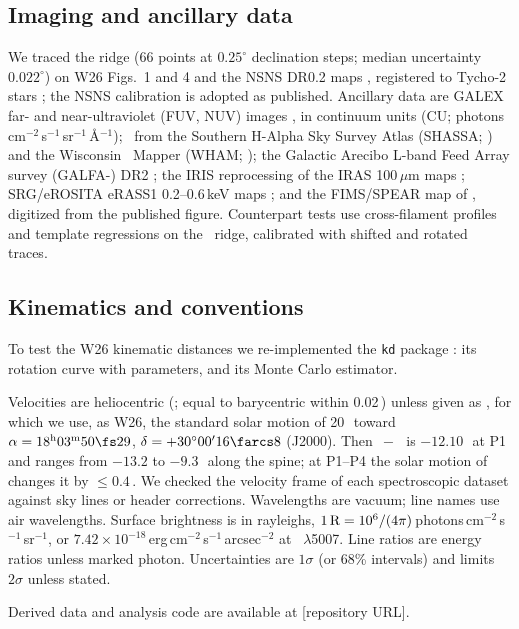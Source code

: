 \subsection{Imaging and ancillary data}

We traced the ridge (66 points at $0.25^\circ$ declination steps; median uncertainty $0.022^\circ$) on W26 Figs.~1 and 4 and the NSNS DR0.2 maps \citep{Ziegenbalg2025}, registered to Tycho-2 stars \citep{Hog2000}; the NSNS calibration is adopted as published. Ancillary data are GALEX far- and near-ultraviolet (FUV, NUV) images \citep{Martin2005,Morrissey2007}, in continuum units (CU; photons\,cm$^{-2}$\,s$^{-1}$\,sr$^{-1}$\,\AA$^{-1}$); \Ha\ from the Southern H-Alpha Sky Survey Atlas (SHASSA; \citealt{Gaustad2001}) and the Wisconsin \Ha\ Mapper (WHAM; \citealt{Haffner2003}); the Galactic Arecibo L-band Feed Array  survey (GALFA-) DR2 \citep{Peek2018}; the IRIS reprocessing of the IRAS 100\,$\mu$m maps \citep{MivilleDeschenes2005}; SRG/eROSITA eRASS1 0.2--0.6\,keV maps \citep{Merloni2024}; and the FIMS/SPEAR  map of \citet{Kim2007}, digitized from the published figure. Counterpart tests use cross-filament profiles and template regressions on the \Oiii\ ridge, calibrated with shifted and rotated traces.

\subsection{Kinematics and conventions}

To test the W26 kinematic distances we re-implemented the \texttt{kd} package \citep{Wenger2018}: its \citet{Persic1996} rotation curve with \citet{Reid2014} parameters, and its Monte Carlo estimator.

Velocities are heliocentric (\vhel; equal to barycentric within 0.02\,\kms) unless given as \vlsr, for which we use, as W26, the standard solar motion of 20\,\kms\ toward $\alpha=18^{\rm h}03^{\rm m}50\fs29$, $\delta=+30^\circ00'16\farcs8$ (J2000). Then \vlsr$\,-\,$\vhel\ is $-12.10$\,\kms\ at P1 and ranges from $-13.2$ to $-9.3$\,\kms\ along the spine; at P1--P4 the solar motion of \citet{Schonrich2010} changes it by $\le0.4$\,\kms. We checked the velocity frame of each spectroscopic dataset against sky lines or header corrections. Wavelengths are vacuum; line names use air wavelengths. Surface brightness is in rayleighs, $1\,{\rm R}=10^6/(4\pi)$\,photons\,cm$^{-2}$\,s$^{-1}$\,sr$^{-1}$, or $7.42\times10^{-18}$\,erg\,cm$^{-2}$\,s$^{-1}$\,arcsec$^{-2}$ at \Oiii~$\lambda$5007. Line ratios are energy ratios unless marked photon. Uncertainties are $1\sigma$ (or 68\% intervals) and limits $2\sigma$ unless stated.

Derived data and analysis code are available at [repository URL].
